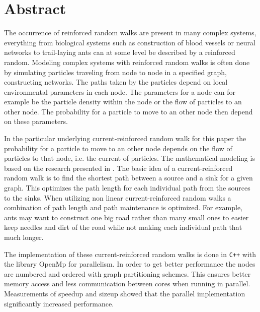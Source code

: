 \section{Abstract}
\label{sec:abstract}

The occurrence of reinforced random walks are present in many complex systems, everything from biological systems such as construction of blood vessels or neural networks to trail-laying ants can at some level be described by a reinforced random. Modeling complex systems with reinforced random walks is often done by simulating particles traveling from node to node in a specified graph, constructing networks. The paths taken by the particles depend on local environmental parameters in each node. The parameters for a node can for example be the particle density within the node or the flow of particles to an other node. The probability for a particle to move to an other node then depend on these parameters.

In the particular underlying current-reinforced random walk for this paper the probability for a particle to move to an other node depends on the flow of particles to that node, i.e. the current of particles. The mathematical modeling is based on the research presented in \cite{Sumpter}. The basic idea of a current-reinforced random walk is to find the shortest path between a source and a sink for a given graph. This optimizes the path length for each individual path from the sources to the sinks. When utilizing non linear current-reinforced random walks a combination of path length and path maintenance is optimized. For example, ants may want to construct one big road rather than many small ones to easier keep needles and dirt of the road while not making each individual path that much longer.

The implementation of these current-reinforced random walks is done in \texttt{C++} with the library OpenMp for parallelism. In order to get better performance the nodes are numbered and ordered with graph partitioning schemes. This ensures better memory access and less communication between cores when running in parallel. Measurements of speedup and sizeup showed that the parallel implementation significantly increased performance. 